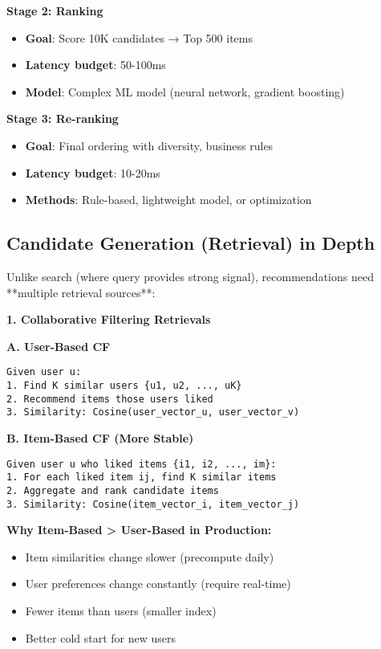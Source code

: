 \documentclass[10pt]{article}
\begin{document}
\textbf{Stage 2: Ranking}
\begin{itemize}
\item \textbf{Goal}: Score 10K candidates → Top 500 items
\item \textbf{Latency budget}: 50-100ms
\item \textbf{Model}: Complex ML model (neural network, gradient boosting)
\end{itemize}

\textbf{Stage 3: Re-ranking}
\begin{itemize}
\item \textbf{Goal}: Final ordering with diversity, business rules
\item \textbf{Latency budget}: 10-20ms
\item \textbf{Methods}: Rule-based, lightweight model, or optimization
\end{itemize}

\subsection{Candidate Generation (Retrieval) in Depth}

Unlike search (where query provides strong signal), recommendations need **multiple retrieval sources**:

\textbf{1. Collaborative Filtering Retrievals}

\textbf{A. User-Based CF}
\begin{verbatim}
Given user u:
1. Find K similar users {u1, u2, ..., uK}
2. Recommend items those users liked
3. Similarity: Cosine(user_vector_u, user_vector_v)
\end{verbatim}

\textbf{B. Item-Based CF (More Stable)}
\begin{verbatim}
Given user u who liked items {i1, i2, ..., im}:
1. For each liked item ij, find K similar items
2. Aggregate and rank candidate items
3. Similarity: Cosine(item_vector_i, item_vector_j)
\end{verbatim}

\textbf{Why Item-Based > User-Based in Production:}
\begin{itemize}
\item Item similarities change slower (precompute daily)
\item User preferences change constantly (require real-time)
\item Fewer items than users (smaller index)
\item Better cold start for new users
\end{itemize}
\end{document}
